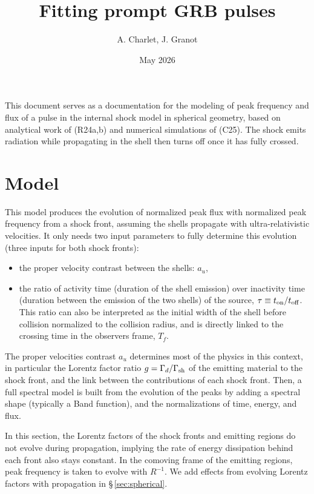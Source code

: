 \documentclass{article}
\title{Fitting prompt GRB pulses}
\author{A. Charlet, J. Granot}
\date{May 2026}
\newcommand{\on}{{\rm on}}
\newcommand{\off}{{\rm off}}
\newcommand{\sh}{{\rm sh}}
\begin{document}
\maketitle

This document serves as a documentation for the modeling of peak frequency and flux of a pulse in the internal shock model in spherical geometry, based on analytical work of \cite{rahaman2024internal, rahaman2024prompt} (R24a,b) and numerical simulations of \cite{charlet2025numerical} (C25). The shock emits radiation while propagating in the shell then turns off once it has fully crossed. %

\section{Model}\label{sec:model_R24}
This model produces the evolution of normalized peak flux with normalized peak frequency from a shock front, assuming the shells propagate with ultra-relativistic velocities. It only needs two input parameters to fully determine this evolution (three inputs for both shock fronts):
\begin{itemize}
    \item the proper velocity contrast between the shells: $a_u$,
    \item the ratio of activity time (duration of the shell emission) over inactivity time (duration between the emission of the two shells) of the source, $\tau\equiv t_\on/t_\off$. This ratio can also be interpreted as the initial width of the shell before collision normalized to the collision radius, and is directly linked to the crossing time in the observers frame, $T_f$.
\end{itemize}
The proper velocities contrast $a_u$ determines most of the physics in this context, in particular the Lorentz factor ratio $g=\Gamma_d/\Gamma_\sh$ of the emitting material to the shock front, and the link between the contributions of each shock front. Then, a full spectral model is built from the evolution of the peaks by adding a spectral shape (typically a Band function), and the normalizations of time, energy, and flux.

In this section, the Lorentz factors of the shock fronts and emitting regions do not evolve during propagation, implying the rate of energy dissipation behind each front also stays constant. In the comoving frame of the emitting regions, peak frequency is taken to evolve with $R^{-1}$. We add effects from evolving Lorentz factors with propagation in \S\,\ref{sec:spherical}.
\end{document}
